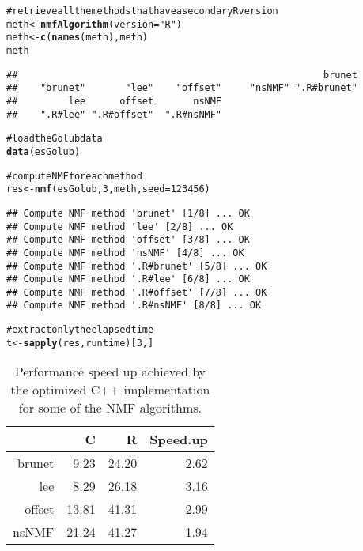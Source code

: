 \documentclass[a4paper]{article}\usepackage{graphicx, color}
\makeatletter
\newcommand{\hlfunctioncall}[1]{\textcolor[rgb]{0.501960784313725,0,0.329411764705882}{\textbf{#1}}}%
\newcommand{\hlstring}[1]{\textcolor[rgb]{0.6,0.6,1}{#1}}%
\newcommand{\hlcomment}[1]{\textcolor[rgb]{0.180392156862745,0.6,0.341176470588235}{#1}}%
\newenvironment{kframe}{%
 \def\at@end@of@kframe{}%
 \ifinner\ifhmode%
  \def\at@end@of@kframe{\end{minipage}}%
  \begin{minipage}{\columnwidth}%
 \fi\fi%
 \def\FrameCommand##1{\hskip\@totalleftmargin \hskip-\fboxsep
 \colorbox{shadecolor}{##1}\hskip-\fboxsep
     \hskip-\linewidth \hskip-\@totalleftmargin \hskip\columnwidth}%
 \MakeFramed {\advance\hsize-\width
   \@totalleftmargin\z@ \linewidth\hsize
   \@setminipage}}%
 {\par\unskip\endMakeFramed%
 \at@end@of@kframe}
\newenvironment{knitrout}{}{} %
\makeatother
\begin{document}
\begin{knitrout}
\color{fgcolor}\begin{kframe}
\begin{alltt}
\hlcomment{# retrieve all the methods that have a secondary R version}
meth <- \hlfunctioncall{nmfAlgorithm}(version = \hlstring{"R"})
meth <- \hlfunctioncall{c}(\hlfunctioncall{names}(meth), meth)
meth
\end{alltt}
\begin{verbatim}
##                                                      brunet 
##    "brunet"       "lee"    "offset"     "nsNMF" ".R#brunet" 
##         lee      offset       nsNMF 
##    ".R#lee" ".R#offset"  ".R#nsNMF"
\end{verbatim}
\begin{alltt}

\hlcomment{# load the Golub data}
\hlfunctioncall{data}(esGolub)

\hlcomment{# compute NMF for each method}
res <- \hlfunctioncall{nmf}(esGolub, 3, meth, seed = 123456)
\end{alltt}
\begin{verbatim}
## Compute NMF method 'brunet' [1/8] ... OK
## Compute NMF method 'lee' [2/8] ... OK
## Compute NMF method 'offset' [3/8] ... OK
## Compute NMF method 'nsNMF' [4/8] ... OK
## Compute NMF method '.R#brunet' [5/8] ... OK
## Compute NMF method '.R#lee' [6/8] ... OK
## Compute NMF method '.R#offset' [7/8] ... OK
## Compute NMF method '.R#nsNMF' [8/8] ... OK
\end{verbatim}
\begin{alltt}

\hlcomment{# extract only the elapsed time}
t <- \hlfunctioncall{sapply}(res, runtime)[3, ]
\end{alltt}
\end{kframe}
\end{knitrout}


\begin{table}[ht]
\begin{center}
\begin{tabular}{rrrr}
  \hline
 & C & R & Speed.up \\ 
  \hline
brunet & 9.23 & 24.20 & 2.62 \\ 
  lee & 8.29 & 26.18 & 3.16 \\ 
  offset & 13.81 & 41.31 & 2.99 \\ 
  nsNMF & 21.24 & 41.27 & 1.94 \\ 
   \hline
\end{tabular}
\caption{Performance speed up achieved by the optimized C++ implementation for some of the NMF algorithms.}
\label{tab:perf}
\end{center}
\end{table}
\end{document}
